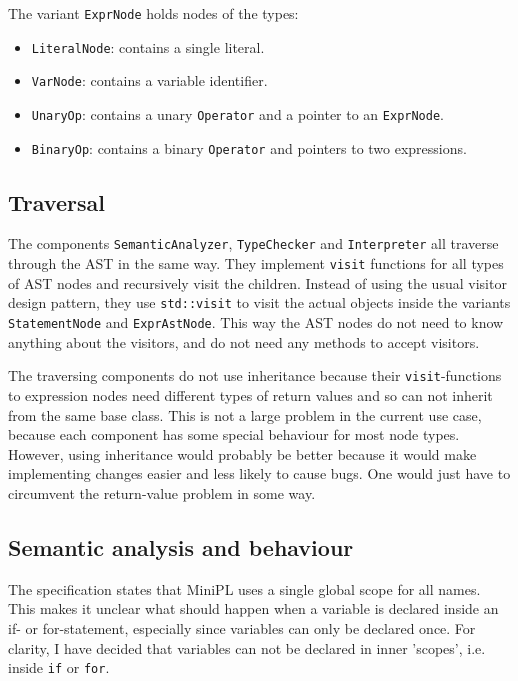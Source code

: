 \documentclass[a4paper]{article}
\newcommand*{\code}[1]{\texttt{#1}}
\begin{document}
The variant \code{ExprNode} holds nodes of the types:
\begin{itemize}
  \item \code{LiteralNode}: contains a single literal.
  \item \code{VarNode}: contains a variable identifier.
  \item \code{UnaryOp}: contains a unary \code{Operator} and a pointer to an 
  \code{ExprNode}.
  \item \code{BinaryOp}: contains a binary \code{Operator} and 
  pointers to two expressions. 
\end{itemize}

\subsection{Traversal}

The components \code{SemanticAnalyzer}, \code{TypeChecker} and 
\code{Interpreter} all traverse through the AST in the same way. 
They implement \code{visit} functions for all types of AST nodes 
and recursively visit the children.
Instead of using the usual visitor design pattern, they use 
\code{std::visit} to visit the actual objects inside the variants
\code{StatementNode} and \code{ExprAstNode}. This way the 
AST nodes do not need to know anything about the visitors, 
and do not need any methods to accept visitors. 

The traversing 
components do not use inheritance because their \code{visit}-functions 
to expression nodes need different types of return values and 
so can not inherit from the same base class. This is not a large 
problem in the current use case, because each component has 
some special behaviour for most node types. However, using 
inheritance would probably be better because it would make 
implementing changes easier and less likely to cause bugs.
One would just have to circumvent the return-value problem in some way.

\subsection{Semantic analysis and behaviour}

The specification states that MiniPL uses a single global scope 
for all names. This makes it unclear what should happen when 
a variable is declared inside an if- or for-statement, 
especially since variables can only be declared once.
For clarity, I have decided that variables can not be 
declared in inner 'scopes', i.e. inside \code{if} or \code{for}.
\end{document}
